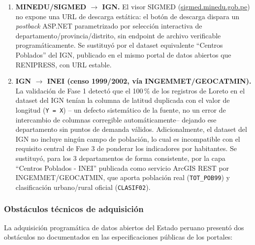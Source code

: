 \documentclass[11pt]{article}
\begin{document}
\begin{enumerate}
  \item \textbf{MINEDU/SIGMED $\rightarrow$ IGN.} El visor SIGMED
    (\url{sigmed.minedu.gob.pe}) no expone una URL de descarga estática:
    el botón de descarga dispara un \textit{postback} ASP.NET parametrizado
    por selección interactiva de departamento/provincia/distrito, sin
    endpoint de archivo verificable programáticamente. Se sustituyó por el
    dataset equivalente ``Centros Poblados'' del IGN, publicado en el mismo
    portal de datos abiertos que RENIPRESS, con URL estable.
  \item \textbf{IGN $\rightarrow$ INEI (censo 1999/2002, vía INGEMMET/GEOCATMIN).}
    La validación de Fase 1 detectó que el 100\,\% de los registros de
    Loreto en el dataset del IGN tenían la columna de latitud duplicada con
    el valor de longitud (\texttt{Y = X}) -- un defecto sistemático de la
    fuente, no un error de intercambio de columnas corregible
    automáticamente-- dejando ese departamento sin puntos de demanda
    válidos. Adicionalmente, el dataset del IGN no incluye ningún campo de
    población, lo cual es incompatible con el requisito central de Fase 3
    de ponderar los indicadores por habitantes. Se sustituyó, para los 3
    departamentos de forma consistente, por la capa ``Centros Poblados -
    INEI'' publicada como servicio ArcGIS REST por INGEMMET/GEOCATMIN, que
    aporta población real (\texttt{TOT\_POB99}) y clasificación
    urbano/rural oficial (\texttt{CLASIF02}).
\end{enumerate}

\subsubsection{Obstáculos técnicos de adquisición}

La adquisición programática de datos abiertos del Estado peruano presentó
dos obstáculos no documentados en las especificaciones públicas de los
portales:
\end{document}
